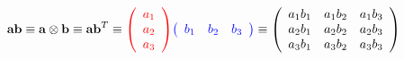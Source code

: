 \documentclass[a4paper]{article}
\begin{document}
\pagestyle{empty}
\begin{equation*}
{\bf{ab}} \equiv
{\bf{a}} \otimes {\bf{b}} \equiv
{\bf{ab}}^T \equiv
{\color{red}
    \left(
        \begin{array}{c}
           a_1 \\ a_2 \\ a_3 
        \end{array}
    \right)
}
{\color{blue}
    \left(
      \begin{array}{ccc}
         b_1 & b_2 & b_3 \\
      \end{array}
    \right)
}
\equiv
\left(
    \begin{array}{ccc}
       a_1b_1 & a_1b_2 & a_1b_3  \\
       a_2b_1 & a_2b_2 & a_2b_3  \\
       a_3b_1 & a_3b_2 & a_3b_3  \\  
    \end{array}
\right)
\end{equation*}
\end{document}
